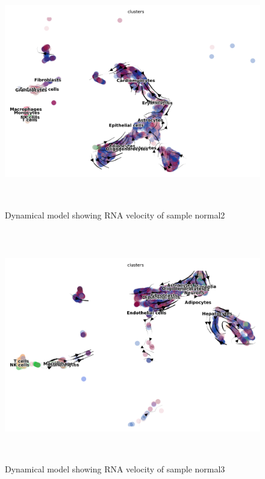 \begin{figure}[!htb]
\begin{center}
\includegraphics[width=6in,height=4in]{../figures/kidney_mouse/normal2_dynamical_model.png}
\end{center}
\caption{Dynamical model showing RNA velocity of sample normal2} 
\label{fig:velocity_normal2}
\end{figure}

\begin{figure}[!htb]
\begin{center}
\includegraphics[width=6in,height=4in]{../figures/kidney_mouse/normal3_dynamical_model.png}
\end{center}
\caption{Dynamical model showing RNA velocity of sample normal3} 
\label{fig:velocity_normal3}
\end{figure}

